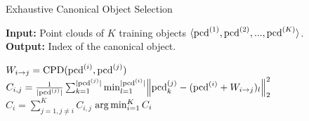 \begin{algorithm}[H]

\caption{Exhaustive Canonical Object Selection}\label{alg:canon_select_1} 

\begin{flushleft}
    \hspace*{\algorithmicindent} \textbf{Input:} Point clouds of $K$ training objects $\langle \mathrm{pcd}^{(1)}, \mathrm{pcd}^{(2)}, ..., \mathrm{pcd}^{(K)} \rangle$. \\
    \hspace*{\algorithmicindent} \textbf{Output:} Index of the canonical object. \\
\end{flushleft}

\begin{algorithmic}[1]

            \State $W_{i \rightarrow j} = \mathrm{CPD}(\mathrm{pcd}^{(i)}, \mathrm{pcd}^{(j)})$ \Comment{\textcolor{blue}{Warp point cloud $i$ to point cloud $j$.}}
            \State $C_{i,j} = \frac{1}{|\mathrm{pcd}^{(j)}|} \sum_{k=1}^{|\mathrm{pcd}^{(j)}|} \min_{l=1}^{|\mathrm{pcd}^{(i)}|} \norm{\mathrm{pcd}^{(j)}_k - (\mathrm{pcd}^{(i)} + W_{i \rightarrow j})_l}_2^2$
        \EndFor
    \EndFor
        \State $C_i = \sum_{j = 1, j \neq i}^K C_{i,j}$ \Comment{\textcolor{blue}{Cumulative cost of point cloud $i$ warps.}}
    \EndFor
    \State \Return $\operatorname*{arg\,min}_{i=1}^K C_i$ \Comment{\textcolor{blue}{Pick point cloud that is the easiest to warp.}}

\end{algorithmic}

\end{algorithm}